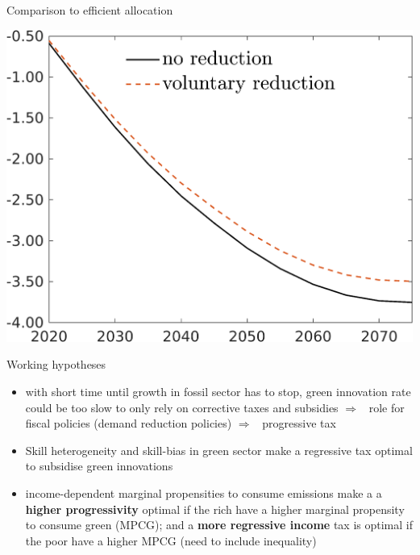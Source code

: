 \documentclass[11pt,aspectratio=169]{beamer}
\newcommand{\ar}{$\Rightarrow$ \ }
\begin{document}
\begin{frame}{Comparison to efficient allocation}
\begin{minipage}[]{0.32\textwidth}
	\includegraphics[width=1\textwidth]{../codding_model/own_basedOnFried/optimalPol_elastS_DisuSci/figures/all_1705/Af_CompEffOPT_T_NoTaus_spillover0_sep1_BN1_ineq1_redCOMP_etaa0.79_lgd1.png}
\end{minipage}
\end{frame}
\appendix
\begin{frame}{Working hypotheses}	
	\begin{itemize}
		\item<+-> with short time until growth in fossil sector has to stop, green innovation rate could be too slow to only rely on corrective taxes and subsidies \ar role for fiscal policies (demand reduction policies) \ar progressive tax
		\vspace{3mm}
		\item<+-> Skill heterogeneity and skill-bias in green sector make a regressive tax optimal to subsidise green innovations
		\vspace{3mm}
		\item<+-> income-dependent marginal propensities to consume emissions make a a \textbf{higher progressivity} optimal if the rich have a higher marginal propensity to consume green (MPCG); and a \textbf{more regressive income} tax is optimal if the poor have a higher MPCG (need to include inequality) 
	\end{itemize}
\end{frame}
\end{document}
